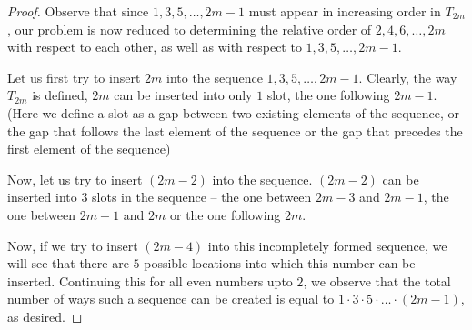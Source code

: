 \documentclass[11pt,letterpaper,twoside,english]{article}
\theoremstyle{theorem}
\theoremstyle{remark}
\begin{document}
\begin{proof}
Observe that since $1,3,5,\ldots,2m-1$ must appear in increasing order in $T_{2m}$, our problem is now reduced to determining the relative order of $2,4,6,\ldots,2m$ with respect to each other, as well as with respect to $1,3,5,\ldots,2m-1$.

Let us first try to insert $2m$ into the sequence $1,3,5,\ldots,2m-1$. Clearly, the way $T_{2m}$ is defined, $2m$ can be inserted into only $1$ slot, the one following $2m-1$. (Here we define a slot as a gap between two existing elements of the sequence, or the gap that follows the last element of the sequence or the gap that precedes the first element of the sequence)

Now, let us try to insert $(2m-2)$ into the sequence. $(2m-2)$ can be inserted into $3$ slots in the sequence -- the one between $2m-3$ and $2m-1$, the one between $2m-1$ and $2m$ or the one following $2m$.

Now, if we try to insert $(2m-4)$ into this incompletely formed sequence, we will see that there are $5$ possible locations into which this number can be inserted. Continuing this for all even numbers upto $2$, we observe that the total number of ways such a sequence can  be created is equal to $1 \cdot 3 \cdot 5 \cdot \ldots \cdot (2m-1)$, as desired.
\end{proof}
\end{document}
